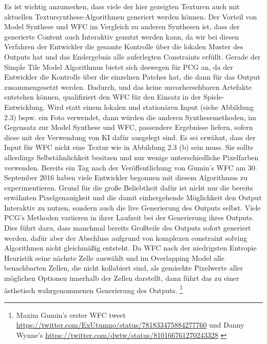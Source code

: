 \documentclass[12pt, a4paper,twoside,openright]{report} %
\begin{document}
Es ist wichtig anzumerken, dass viele der hier gezeigten Texturen auch mit aktuellen Textursynthese-Algorithmen generiert werden können.
Der Vorteil von Model Synthese und WFC im Vergleich zu anderen Synthesen ist, dass der generierte Content auch Interaktiv genutzt werden kann,
da wir bei diesen Verfahren der Entwickler die gesamte Kontrolle über die lokalen Muster des Outputs hat und das Endergebnis alle auferlegten Constraints erfüllt.
Gerade der Simple Tile Model Algorithmus bietet sich deswegen für PCG an, da der Entwickler die Kontrolle über die einzelnen Patches hat,
die dann für das Output zusammengesetzt werden.
Dadurch, und das keine unvorhersehbaren Artefakte entstehen können, qualifiziert den WFC für den Einsatz in der Spiele-Entwicklung.
Wird statt einem lokalen und stationären Input {(siehe Abbildung 2.3)} bspw. ein Foto verwendet,
dann würden die anderen Synthesemethoden, im Gegensatz zur Model Synthese und WFC, passendere Ergebnisse liefern, sofern diese mit der Verwendung von KI dafür ausgelegt sind.
Es sei erwähnt, dass der Input für WFC nicht  eine Textur wie in Abbildung 2.3 {(b)} sein muss.
Sie sollte allerdings Selbstähnlichkeit besitzen und nur wenige unterschiedliche Pixelfarben verwenden.
\newline
Bereits ein Tag nach der Veröffentlichung von Gumin's WFC am 30. September 2016 haben viele Entwickler begonnen mit diesem Algorithmus zu experimentieren.
Grund für die große Beliebtheit dafür ist nicht nur die bereits erwähnten Pixelgenauigkeit und die damit einhergehende Möglichkeit den Output Interaktiv zu nutzen,
sondern auch die live Generierung des Outputs selbst.
Viele PCG's Methoden variieren in ihrer Laufzeit bei der Generierung ihres Outputs.
Dies führt dazu, dass manchmal bereits Großteile des Outputs sofort generiert werden,
dafür aber der Abschluss aufgrund von komplexen constraint solving Algorithmen nicht gleichmäßig entsteht. \cite{Karth2017WaveFunctionCollapseIC}
Da WFC nach der niedrigsten Entropie Heuristik seine nächste Zelle auswählt und im Overlapping Model alle benachbarten Zellen, die nicht kollabiert sind,
als gemischte Pixelwerte aller möglichen Optionen innerhalb der Zellen darstellt, dann führt das zu einer ästhetisch wahrgenommenen Generierung des Outputs.
\footnote[4]{Maxim Gumin’s erster WFC tweet 
\newline
\url{https://twitter.com/ExUtumno/status/781833475884277760}
\newline
und Danny Wynne’s 
\newline
\url{https://twitter.com/dwtw/status/810166761270243328} \cite{Karth2017WaveFunctionCollapseIC}}
\end{document}
